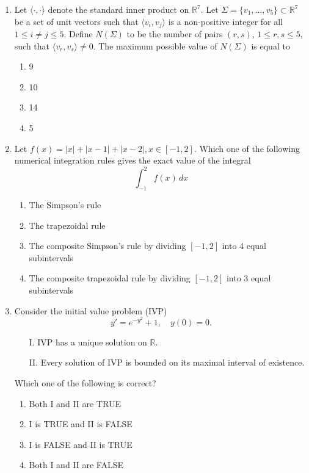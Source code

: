 \documentclass[journal]{IEEEtran}
\numberwithin{equation}{enumi}
\numberwithin{figure}{enumi}
\begin{document}
\begin{enumerate}
\bigskip
\item Let $\langle \cdot, \cdot \rangle$ denote the standard inner product on $\mathbb{R}^7$. Let $\Sigma = \{v_1, \ldots, v_5\} \subset \mathbb{R}^7$ be a set of unit vectors such that $\langle v_i, v_j \rangle$ is a non-positive integer for all $1 \leq i \neq j \leq 5$. Define $N(\Sigma)$ to be the number of pairs $(r, s)$, $1 \leq r, s \leq 5$, such that $\langle v_r, v_s \rangle \neq 0$. The maximum possible value of $N(\Sigma)$ is equal to
\begin{enumerate}
    \item 9
    \item 10
    \item 14
    \item 5
\end{enumerate}
\bigskip
\item Let $f(x) = |x| + |x - 1| + |x - 2|, x \in [-1, 2]$. Which one of the following numerical integration rules gives the exact value of the integral
\[
\int_{-1}^2 f(x) \, dx
\]
\begin{enumerate}
    \item The Simpson's rule
    \item The trapezoidal rule
    \item The composite Simpson's rule by dividing $[-1, 2]$ into 4 equal subintervals
    \item The composite trapezoidal rule by dividing $[-1, 2]$ into 3 equal subintervals
\end{enumerate}

\item Consider the initial value problem (IVP)
\[
y' = e^{-y^2} + 1, \quad y(0) = 0.
\]
\begin{enumerate}
    \item[I.] IVP has a unique solution on $\mathbb{R}$.
    \item[II.] Every solution of IVP is bounded on its maximal interval of existence.
\end{enumerate}
Which one of the following is correct?
\begin{enumerate}
    \item Both I and II are TRUE
    \item I is TRUE and II is FALSE
    \item I is FALSE and II is TRUE
    \item Both I and II are FALSE
\end{enumerate}


\end{enumerate}
\end{document}
